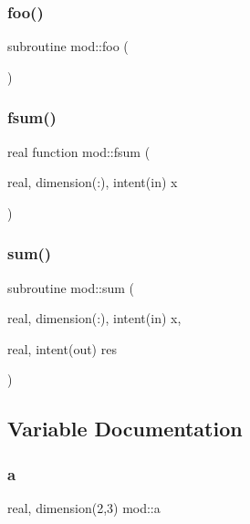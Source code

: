 \subsubsection{\texorpdfstring{foo()}{foo()}}
{\footnotesize\ttfamily subroutine mod\+::foo (\begin{DoxyParamCaption}{ }\end{DoxyParamCaption})}

\mbox{\label{namespacemod_a9aceda52f5106b41e537f39657d081ed}} 
\subsubsection{\texorpdfstring{fsum()}{fsum()}}
{\footnotesize\ttfamily real function mod\+::fsum (\begin{DoxyParamCaption}\item[{real, dimension(\+:), intent(in)}]{x }\end{DoxyParamCaption})}

\mbox{\label{namespacemod_a4df844757a1ca6f044e63c1312516b93}} 
\subsubsection{\texorpdfstring{sum()}{sum()}}
{\footnotesize\ttfamily subroutine mod\+::sum (\begin{DoxyParamCaption}\item[{real, dimension(\+:), intent(in)}]{x,  }\item[{real, intent(out)}]{res }\end{DoxyParamCaption})}



\subsection{Variable Documentation}
\mbox{\label{namespacemod_a3c8f710d4976f60a184c79844967ea3e}} 
\subsubsection{\texorpdfstring{a}{a}}
{\footnotesize\ttfamily real, dimension(2,3) mod\+::a}

\mbox{\label{namespacemod_a4f401ab50cd047642f8f42d3ac55a9dc}} 
